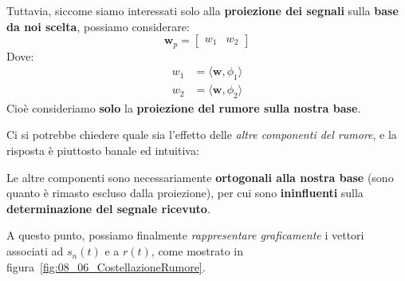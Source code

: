 Tuttavia, siccome siamo interessati solo alla \textbf{proiezione dei segnali} sulla 
\textbf{base da noi scelta}, possiamo considerare:
\[
    \mathbf{w}_p = \begin{bmatrix} w_{1} & w_{2} \end{bmatrix} 
\]
Dove:
\[
    \begin{aligned}
        w_{1} &= \langle \mathbf{w}, \phi_{1} \rangle \\ 
        w_{2} &= \langle \mathbf{w}, \phi_{2} \rangle
    \end{aligned}
\]
Cioè consideriamo \textbf{solo} la \textbf{proiezione del rumore sulla nostra base}.

Ci si potrebbe chiedere quale sia l'effetto delle \textit{altre componenti del rumore}, e
la risposta è piuttosto banale ed intuitiva:

\begin{remark}
    Le altre componenti sono necessariamente \textbf{ortogonali alla nostra base}
    (sono quanto è rimasto escluso dalla proiezione), per cui sono \textbf{ininfluenti}
    sulla \textbf{determinazione del segnale ricevuto}.
\end{remark}

A questo punto, possiamo finalmente \textit{rappresentare graficamente} i vettori associati 
ad $s_n(t)$ e a $r(t)$, come mostrato in figura~\ref{fig:08_06_CostellazioneRumore}.

